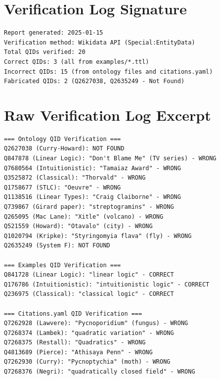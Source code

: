 \section*{Verification Log Signature}

\begin{verbatim}
Report generated: 2025-01-15
Verification method: Wikidata API (Special:EntityData)
Total QIDs verified: 20
Correct QIDs: 3 (all from examples/*.ttl)
Incorrect QIDs: 15 (from ontology files and citations.yaml)
Fabricated QIDs: 2 (Q2627038, Q2635249 - Not Found)
\end{verbatim}

\section*{Raw Verification Log Excerpt}

\begin{verbatim}
=== Ontology QID Verification ===
Q2627038 (Curry-Howard): NOT FOUND
Q847878 (Linear Logic): "Don't Blame Me" (TV series) - WRONG
Q7680564 (Intuitionistic): "Tamaiaz Award" - WRONG
Q3525872 (Classical): "Thorvald" - WRONG
Q1758677 (STLC): "Oeuvre" - WRONG
Q1138516 (Linear Types): "Craig Claiborne" - WRONG
Q739867 (Girard paper): "streptogramins" - WRONG
Q265095 (Mac Lane): "Xitle" (volcano) - WRONG
Q521559 (Howard): "Otavalo" (city) - WRONG
Q1020794 (Kripke): "Styringomyia flava" (fly) - WRONG
Q2635249 (System F): NOT FOUND

=== Examples QID Verification ===
Q841728 (Linear Logic): "linear logic" - CORRECT
Q176786 (Intuitionistic): "intuitionistic logic" - CORRECT
Q236975 (Classical): "classical logic" - CORRECT

=== Citations.yaml QID Verification ===
Q7262928 (Lawvere): "Pycnoporidium" (fungus) - WRONG
Q7268374 (Lambek): "quadratic variation" - WRONG
Q7268375 (Restall): "Quadratics" - WRONG
Q4813689 (Pierce): "Athisaya Penn" - WRONG
Q7262930 (Curry): "Pycnoptychia" (moth) - WRONG
Q7268376 (Negri): "quadratically closed field" - WRONG
\end{verbatim}
